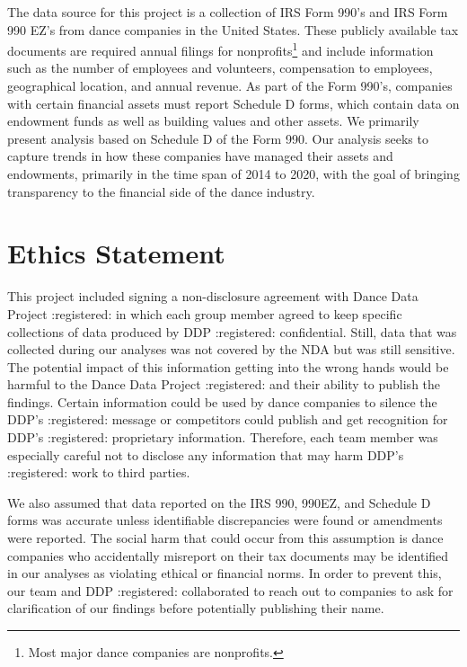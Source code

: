 \documentclass[Dance Data
Project,article,submit,moreauthors,pdftex]{mdpi}
\begin{document}
The data source for this project is a collection of IRS Form 990's and
IRS Form 990 EZ's from dance companies in the United States. These
publicly available tax documents are required annual filings for
nonprofits\footnote{Most major dance companies are nonprofits.} and
include information such as the number of employees and volunteers,
compensation to employees, geographical location, and annual revenue. As
part of the Form 990's, companies with certain financial assets must
report Schedule D forms, which contain data on endowment funds as well
as building values and other assets. We primarily present analysis based
on Schedule D of the Form 990. Our analysis seeks to capture trends in
how these companies have managed their assets and endowments, primarily
in the time span of 2014 to 2020, with the goal of bringing transparency
to the financial side of the dance industry.

\hypertarget{ethics-statement}{%
\section{Ethics Statement}\label{ethics-statement}}

This project included signing a non-disclosure agreement with Dance Data
Project :registered: in which each group member agreed to keep specific
collections of data produced by DDP :registered: confidential. Still,
data that was collected during our analyses was not covered by the NDA
but was still sensitive. The potential impact of this information
getting into the wrong hands would be harmful to the Dance Data Project
:registered: and their ability to publish the findings. Certain
information could be used by dance companies to silence the DDP's
:registered: message or competitors could publish and get recognition
for DDP's :registered: proprietary information. Therefore, each team
member was especially careful not to disclose any information that may
harm DDP's :registered: work to third parties.

We also assumed that data reported on the IRS 990, 990EZ, and Schedule D
forms was accurate unless identifiable discrepancies were found or
amendments were reported. The social harm that could occur from this
assumption is dance companies who accidentally misreport on their tax
documents may be identified in our analyses as violating ethical or
financial norms. In order to prevent this, our team and DDP :registered:
collaborated to reach out to companies to ask for clarification of our
findings before potentially publishing their name.
\end{document}
